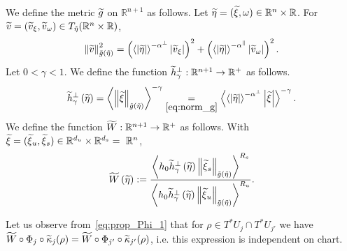 \documentclass[AHL,Unicode,longabstracts,published]{cedram}
\newcommand{\bbR}{\mathbb{R}}
\let\oldtilde\tilde
\renewcommand*{\tilde}[1]{\mathchoice{\widetilde{#1}}{\widetilde{#1}}{\oldtilde{#1}}{\oldtilde{#1}}}
\newcommand{\bbR}{\mathbb{R}}
\begin{document}

We define the metric $\tilde{g}$ on $\bbR^{n+1}$ as follows. Let $\tilde{\eta}=(\tilde{\xi},\omega)\in\bbR^{n}\times\bbR$. For $\tilde{v}=(\tilde{v}_{\xi},\tilde{v}_{\omega})\in T_{\tilde{\eta}}(\bbR^{n}\times\bbR)$,
\begin{equation}\label{eq:norm_g}
\left\Vert \tilde{v}\right\Vert _{\tilde{g}\left(\tilde{\eta}\right)}^{2}=\left(\left\langle \left|\tilde{\eta}\right|\right\rangle ^{-\alpha^{\perp}}\left|\tilde{v}_{\xi}\right|\right)^{2}+\left(\left\langle \left|\tilde{\eta}\right|\right\rangle ^{-\alpha^{\parallel}}\left|\tilde{v}_{\omega}\right|\right)^{2}.
\end{equation}
Let $0<\gamma<1$. We define the function $\tilde{h}_{\gamma}^{\perp}:\bbR^{n+1}\rightarrow\bbR^{+}$ as follows.
\begin{equation}\label{eq:h_tilde}
\tilde{h}_{\gamma}^{\perp}\left(\tilde{\eta}\right)=\left\langle \left\Vert \tilde{\xi}\right\Vert _{\tilde{g}\left(\tilde{\eta}\right)}\right\rangle ^{-\gamma}\underset{\eqref{eq:norm_g}}{=}\left\langle \left\langle \left|\tilde{\eta}\right|\right\rangle ^{-\alpha^{\perp}}\left|\tilde{\xi}\right|\right\rangle ^{-\gamma}.
\end{equation}
We define the function $\tilde{W}:\bbR^{n+1}\rightarrow\bbR^{+}$ as follows. With $\tilde{\xi}=(\tilde{\xi}{}_{u},\tilde{\xi}{}_{s})\in\bbR^{d_{u}}\times\bbR^{d_{s}}=~\bbR^{n}$,
\begin{equation}\label{eq:def_W_tilde}
\tilde{W}\left(\tilde{\eta}\right):=\frac{\left\langle h_{0}\tilde{h}_{\gamma}^{\perp}\left(\tilde{\eta}\right)\left\Vert \tilde{\xi}{}_{s}\right\Vert _{\tilde{g}\left(\tilde{\eta}\right)}\right\rangle ^{R_{s}}}{\left\langle h_{0}\tilde{h}_{\gamma}^{\perp}\left(\tilde{\eta}\right)\left\Vert \tilde{\xi}{}_{u}\right\Vert _{\tilde{g}\left(\tilde{\eta}\right)}\right\rangle ^{R_{u}}}.
\end{equation}

\begin{rema}
Let us observe from~\eqref{eq:prop_Phi_1} that for $\rho\in T^{*}U_{j}\cap T^{*}U_{j'}$ we have $\tilde{W}\circ\Phi_{j}\circ\tilde{\kappa}_{j}(\rho)=\tilde{W}\circ\Phi_{j'}\circ\tilde{\kappa}_{j'}(\rho)$, i.e. this expression is independent on chart.
\end{rema}
\end{document}
